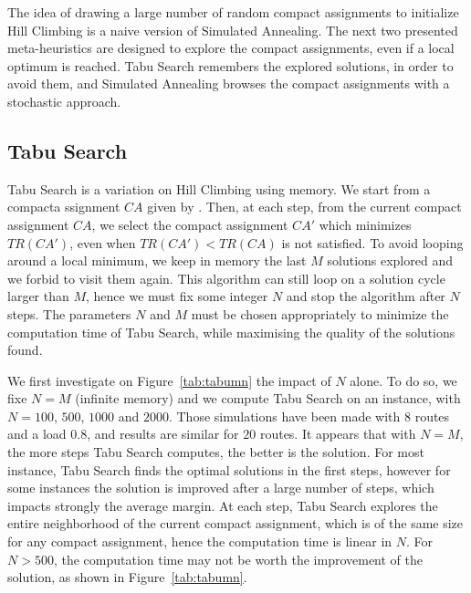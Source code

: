  The idea of drawing a large number of random compact assignments to initialize Hill Climbing is a naive version of Simulated Annealing. The next two presented meta-heuristics are designed to explore the compact assignments, even if a local optimum is reached. Tabu Search remembers the explored solutions, in order to avoid them, and Simulated Annealing browses the compact assignments with a stochastic approach.

\subsection{Tabu Search}

Tabu Search is a variation on Hill Climbing using memory. We start from a compacta ssignment $CA$ given by \hybridgreedynormalized. Then, at each step, from the current compact assignment $CA$, we select the compact assignment $CA'$ which minimizes $TR(CA')$, even when $TR(CA') < TR(CA)$ is not satisfied. To avoid looping around a local minimum, we keep in memory the last $M$ solutions explored and we forbid to visit them again. This algorithm can still loop on a solution cycle larger than $M$, hence we must fix some integer $N$ and stop the algorithm after $N$ steps.
The parameters $N$ and $M$ must be chosen appropriately to minimize the computation time of Tabu Search, while maximising the quality of the solutions found. 

We first investigate on Figure~\ref{tab:tabumn} the impact of $N$ alone. To do so, we fixe $N = M$ (infinite memory) and we compute  Tabu Search on an instance, with $N = 100$, $500$, $1000$ and $2000$. Those simulations have been made with $8$ routes and a load $0.8$, and results are similar for $20$ routes. It appears that with $N=M$, the more steps Tabu Search computes, the better is the solution. For most instance, Tabu Search finds the optimal solutions in the first steps, however for some instances the solution is improved after a large number of steps, which impacts strongly the average margin. At each step, Tabu Search explores the entire neighborhood of the current compact assignment,
which is of the same size for any compact assignment, hence the computation time is linear in $N$. For $N > 500$, the computation time may not be worth the improvement of the solution, as shown in Figure~\ref{tab:tabumn}.



